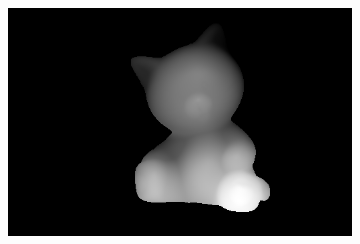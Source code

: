 \documentclass{paper}
\begin{document}
\begin{figure}[h!]
\begin{subfigure}{0.3\textwidth}
        \includegraphics[width=\textwidth]{results/cat/cat_depthmap}
    \end{subfigure}
    

\end{figure}
\end{document}
